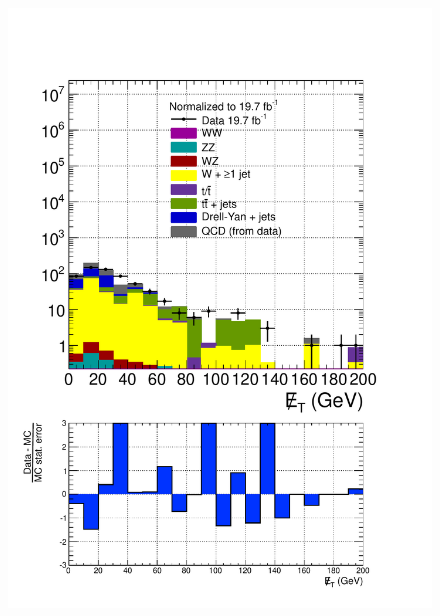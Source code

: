 \begin{figure}[hbtp]
  \begin{center}
    \includegraphics[width=\cmsFigWidth]{figures/dataVsMCQCD_MET_lowMT_v87}

\end{center}
\end{figure}
